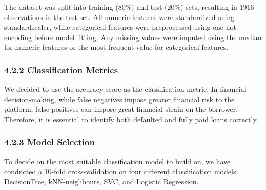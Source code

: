 \documentclass[
  letterpaper,
  DIV=11,
  numbers=noendperiod]{scrartcl}
\begin{document}
The dataset was split into training (80\%) and test (20\%) sets,
resulting in 1916 observations in the test set. All numeric features
were standardized using standardscaler, while categorical features were
preprocessed using one-hot encoding before model fitting. Any missing
values were imputed using the median for numeric features or the most
frequent value for categorical features.

\subsubsection{4.2.2 Classification
Metrics}\label{classification-metrics}

We decided to use the accuracy score as the classification metric. In
financial decision-making, while false negatives impose greater
financial risk to the platform, false positives can impose great
financial strain on the borrower. Therefore, it is essential to identify
both defaulted and fully paid loans correctly.

\subsubsection{4.2.3 Model Selection}\label{model-selection}

To decide on the most suitable classification model to build on, we have
conducted a 10-fold cross-validation on four different classification
models: DecisionTree, kNN-neighbours, SVC, and Logistic Regression.
\end{document}
